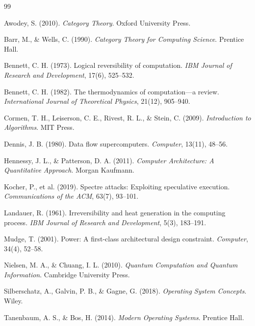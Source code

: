 \documentclass[twocolumn,10pt]{article}
\theoremstyle{definition}
\theoremstyle{remark}
\begin{document}

\begin{thebibliography}{99}

Awodey, S. (2010). \textit{Category Theory}. Oxford University Press.

Barr, M., \& Wells, C. (1990). \textit{Category Theory for Computing Science}. Prentice Hall.

Bennett, C. H. (1973). Logical reversibility of computation. \textit{IBM Journal of Research and Development}, 17(6), 525--532.

Bennett, C. H. (1982). The thermodynamics of computation—a review. \textit{International Journal of Theoretical Physics}, 21(12), 905--940.

Cormen, T. H., Leiserson, C. E., Rivest, R. L., \& Stein, C. (2009). \textit{Introduction to Algorithms}. MIT Press.

Dennis, J. B. (1980). Data flow supercomputers. \textit{Computer}, 13(11), 48--56.

Hennessy, J. L., \& Patterson, D. A. (2011). \textit{Computer Architecture: A Quantitative Approach}. Morgan Kaufmann.

Kocher, P., et al. (2019). Spectre attacks: Exploiting speculative execution. \textit{Communications of the ACM}, 63(7), 93--101.

Landauer, R. (1961). Irreversibility and heat generation in the computing process. \textit{IBM Journal of Research and Development}, 5(3), 183--191.

Mudge, T. (2001). Power: A first-class architectural design constraint. \textit{Computer}, 34(4), 52--58.

Nielsen, M. A., \& Chuang, I. L. (2010). \textit{Quantum Computation and Quantum Information}. Cambridge University Press.

Silberschatz, A., Galvin, P. B., \& Gagne, G. (2018). \textit{Operating System Concepts}. Wiley.

Tanenbaum, A. S., \& Bos, H. (2014). \textit{Modern Operating Systems}. Prentice Hall.

\end{thebibliography}
\end{document}
